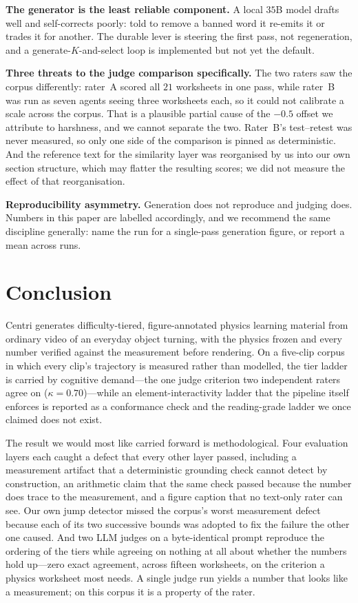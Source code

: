 \documentclass[conference]{IEEEtran}
\begin{document}
\textbf{The generator is the least reliable component.} A local $35$B model
drafts well and self-corrects poorly: told to remove a banned word it re-emits
it or trades it for another. The durable lever is steering the first pass, not
regeneration, and a generate-$K$-and-select loop is implemented but not yet the
default.

\textbf{Three threats to the judge comparison specifically.} The two raters saw
the corpus differently: rater~A scored all $21$ worksheets in one pass, while
rater~B was run as seven agents seeing three worksheets each, so it could not
calibrate a scale across the corpus. That is a plausible partial cause of the
$-0.5$ offset we attribute to harshness, and we cannot separate the two.
Rater~B's test--retest was never measured, so only one side of the comparison
is pinned as deterministic. And the reference text for the similarity layer was
reorganised by us into our own section structure, which may flatter the
resulting scores; we did not measure the effect of that reorganisation.

\textbf{Reproducibility asymmetry.} Generation does not reproduce and judging
does. Numbers in this paper are labelled accordingly, and we recommend the
same discipline generally: name the run for a single-pass generation figure, or
report a mean across runs.

\section{Conclusion}

Centri generates difficulty-tiered, figure-annotated physics learning material
from ordinary video of an everyday object turning, with the physics frozen and
every number verified against the measurement before rendering. On a five-clip
corpus in which every clip's trajectory is measured rather than modelled, the
tier ladder is carried by cognitive demand---the one judge criterion two
independent raters agree on ($\kappa = 0.70$)---while an element-interactivity
ladder that the pipeline itself enforces is reported as a conformance check and
the reading-grade ladder we once claimed does not exist.

The result we would most like carried forward is methodological. Four
evaluation layers each caught a defect that every other layer passed, including
a measurement artifact that a deterministic grounding check cannot detect by
construction, an arithmetic claim that the same check passed because the number
does trace to the measurement, and a figure caption that no text-only rater can
see. Our own jump detector missed the corpus's worst measurement defect because
each of its two successive bounds was adopted to fix the failure the other one
caused. And two LLM judges on a byte-identical prompt reproduce the ordering of
the tiers while agreeing on nothing at all about whether the numbers hold
up---zero exact agreement, across fifteen worksheets, on the criterion a physics
worksheet most needs. A single judge run yields a number that looks like a
measurement; on this corpus it is a property of the rater.
\end{document}
